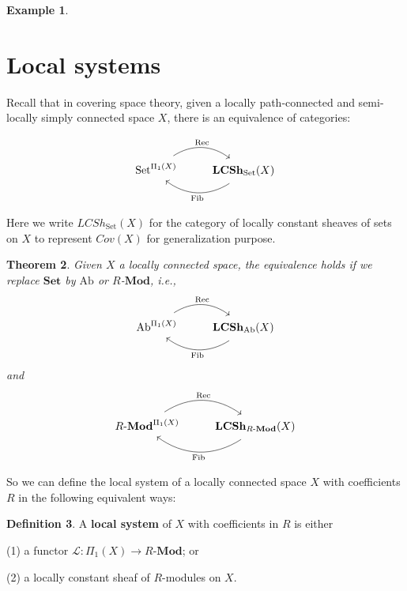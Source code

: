 \documentclass[12pt, reqno]{amsart}
\newtheorem{theorem}{Theorem}[section]
\theoremstyle{definition}
\newtheorem{definition}[theorem]{Definition}
\newtheorem{example}[theorem]{Example}
\theoremstyle{remark}
\numberwithin{equation}{section}
\begin{document}
{\begin{example}
\end{example}

\section{Local systems}

Recall that in covering space theory, given a locally path-connected and semi-locally simply connected space $X$, there is an equivalence of categories:

\[
\begin{tikzcd}
\mathbf{\operatorname{Set}}^{\Pi_1(X)}
    \ar[r, bend left=35, "{\mathrm{Rec}}", shift left=0.6ex]
& 
\mathbf{LCSh}_{\operatorname{Set}}(X) 
    \ar[l, bend left=35, "{\mathrm{Fib}}", shift left=0.6ex]
\end{tikzcd}
\]

Here we write ${LCSh}_{\operatorname{Set}}(X)$ for the category of locally constant sheaves of sets on $X$ to represent $Cov(X)$ for generalization purpose. 

\begin{theorem}
Given $X$ a locally connected space, the equivalence holds if we replace $\mathbf{Set}$ by $\mathrm{Ab}$ or $R$-$\mathbf{Mod}$, i.e.,
\[
\begin{tikzcd}
\mathbf{\operatorname{Ab}}^{\Pi_1(X)}
    \ar[r, bend left=35, "{\mathrm{Rec}}", shift left=0.6ex]
&
\mathbf{LCSh}_{\operatorname{Ab}}(X) 
    \ar[l, bend left=35, "{\mathrm{Fib}}", shift left=0.6ex]
\end{tikzcd}
\]
and
\[
\begin{tikzcd}
R\text{-}\mathbf{Mod}^{\Pi_1(X)}
    \ar[r, bend left=35, "{\mathrm{Rec}}", shift left=0.6ex]
&
\mathbf{LCSh}_{R\text{-}\mathbf{Mod}}(X)
    \ar[l, bend left=35, "{\mathrm{Fib}}", shift left=0.6ex]
\end{tikzcd}
\]
\end{theorem}

So we can define the local system of a locally connected space $X$ with coefficients $R$ in the following equivalent ways:

\begin{definition}
A \textbf{local system} of $X$ with coefficients in $R$ is either 

(1) a functor $\mathcal{L}: \Pi_1(X) \to R$-$\mathbf{Mod}$; or 

(2) a locally constant sheaf of $R$-modules on $X$.

\end{definition}

}
\end{document}
